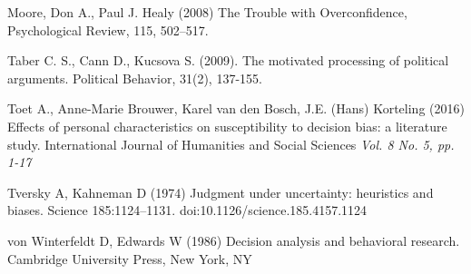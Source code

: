 \documentclass[a4paper,11pt]{article}
\begin{document}
\begin{thebibliography}{}
Moore, Don A., Paul J. Healy (2008) The Trouble with Overconfidence, Psychological Review, 115, 502–517.

Taber C. S., Cann D., Kucsova S. (2009). The motivated processing of political arguments. Political Behavior, 31(2), 137-155.

Toet A., Anne-Marie Brouwer, Karel van den Bosch, J.E. (Hans) Korteling (2016) Effects of personal characteristics on susceptibility to decision bias: a literature study. International Journal of Humanities and Social Sciences \textit{Vol. 8 No. 5, pp. 1-17}

Tversky A, Kahneman D (1974) Judgment under uncertainty: heuristics and biases. Science
185:1124–1131. doi:10.1126/science.185.4157.1124

von Winterfeldt D, Edwards W (1986) Decision analysis and behavioral research. Cambridge University Press, New York, NY



\end{thebibliography}
\end{document}
